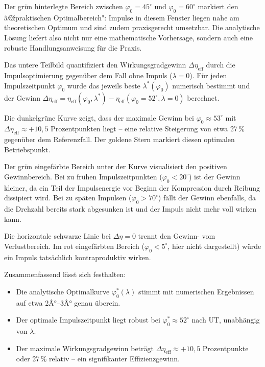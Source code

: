 ﻿\documentclass[a4paper,12pt]{article}
\begin{document}
Der grün hinterlegte Bereich zwischen $\varphi_0 = 45^\circ$ und
$\varphi_0 = 60^\circ$ markiert den â€žpraktischen Optimalbereich": Impulse
in diesem Fenster liegen nahe am theoretischen Optimum und sind zudem
praxisgerecht umsetzbar. Die analytische Lösung liefert also nicht nur eine
mathematische Vorhersage, sondern auch eine robuste Handlungsanweisung für
die Praxis.

Das untere Teilbild quantifiziert den Wirkungsgradgewinn $\Delta\eta_\text{eff}$
durch die Impulsoptimierung gegenüber dem Fall ohne Impuls ($\lambda = 0$).
Für jeden Impulszeitpunkt $\varphi_0$ wurde das jeweils beste $\lambda^*(\varphi_0)$
numerisch bestimmt und der Gewinn $\Delta\eta_\text{eff} = \eta_\text{eff}(\varphi_0, \lambda^*) - \eta_\text{eff}(\varphi_0=52^\circ, \lambda=0)$
berechnet.

Die dunkelgrüne Kurve zeigt, dass der maximale Gewinn bei $\varphi_0 \approx 53^\circ$
mit $\Delta\eta_\text{eff} \approx +10{,}5$ Prozentpunkten liegt -- eine
relative Steigerung von etwa 27\,\% gegenüber dem Referenzfall. Der goldene
Stern markiert diesen optimalen Betriebspunkt.

Der grün eingefärbte Bereich unter der Kurve visualisiert den positiven
Gewinnbereich. Bei zu frühen Impulszeitpunkten ($\varphi_0 < 20^\circ$)
ist der Gewinn kleiner, da ein Teil der Impulsenergie vor Beginn der
Kompression durch Reibung dissipiert wird. Bei zu späten Impulsen
($\varphi_0 > 70^\circ$) fällt der Gewinn ebenfalls, da die Drehzahl bereits
stark abgesunken ist und der Impuls nicht mehr voll wirken kann.

Die horizontale schwarze Linie bei $\Delta\eta = 0$ trennt den Gewinn- vom
Verlustbereich. Im rot eingefärbten Bereich ($\varphi_0 < 5^\circ$, hier
nicht dargestellt) würde ein Impuls tatsächlich kontraproduktiv wirken.

Zusammenfassend lässt sich festhalten:

\begin{itemize}
  \item Die analytische Optimalkurve $\varphi_0^*(\lambda)$ stimmt mit
    numerischen Ergebnissen auf etwa 2Â°--3Â° genau überein.
  \item Der optimale Impulszeitpunkt liegt robust bei $\varphi_0^* \approx 52^\circ$
    nach UT, unabhängig von $\lambda$.
  \item Der maximale Wirkungsgradgewinn beträgt $\Delta\eta_\text{eff} \approx +10{,}5$
    Prozentpunkte oder 27\,\% relativ -- ein signifikanter Effizienzgewinn.
\end{itemize}
\end{document}
